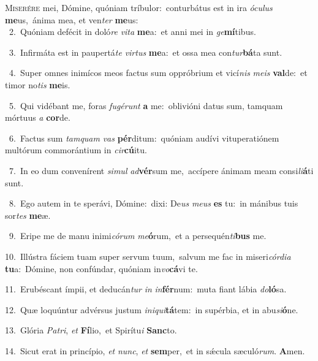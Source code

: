 \lettrine{\initial\textcolor{\initialcolor}{M}}{iserére} mei, Dómine, quóniam tríbulor:~\dagger conturbátus est in ira \textit{ó}\-\textit{cu}\textit{lus} \textbf{me}\-us,~\star ánima mea, et ven\textit{ter} \textbf{me}\-us:\\
{\numbfont\textcolor{\numbcolor}{~2.}}~Quóniam defécit in doló\textit{re} \textit{vi}\-\textit{ta} \textbf{me}\-a:~\star et anni mei in \textit{ge}\-\textbf{mí}tibus.\par
{\numbfont\textcolor{\numbcolor}{~3.}}~Infirmáta est in paupertá\textit{te} \textit{vir}\-\textit{tus} \textbf{me}\-a:~\star et ossa mea con\-\textit{tur}\-\textbf{bá}ta sunt.\par
{\numbfont\textcolor{\numbcolor}{~4.}}~Super omnes inimícos meos factus sum oppróbrium et vicí\textit{nis} \textit{me}\-\textit{is} \textbf{val}\-de:~\star et timor no\textit{tis} \textbf{me}\-is.\par
{\numbfont\textcolor{\numbcolor}{~5.}}~Qui vidébant me, foras \textit{fu}\-\textit{gé}\textit{runt} \textbf{a} me:~\star oblivióni datus sum, tamquam mórtuus \textit{a} \textbf{cor}\-de.\par
{\numbfont\textcolor{\numbcolor}{~6.}}~Factus sum \textit{tam}\-\textit{quam} \textit{vas} \textbf{pér}\-ditum:~\star quóniam audívi vituperatiónem multórum commorántium in \textit{cir}\-\textbf{cú}itu.\par
{\numbfont\textcolor{\numbcolor}{~7.}}~In eo dum convenírent \textit{si}\-\textit{mul} \textit{ad}\-\textbf{vér}sum me,~\star accípere ánimam meam consi\-\textit{li}\-\textbf{á}ti sunt.\par
{\numbfont\textcolor{\numbcolor}{~8.}}~Ego autem in te sperávi, Dómine:~\dagger dixi: De\textit{us} \textit{me}\-\textit{us} \textbf{es} tu:~\star in mánibus tuis sor\textit{tes} \textbf{me}\-æ.\par
{\numbfont\textcolor{\numbcolor}{~9.}}~Eripe me de manu inimi\-\textit{có}\-\textit{rum} \textit{me}\-\textbf{ó}rum,~\star et a persequén\-\textit{ti}\-\textbf{bus} me.\par
{\numbfont\textcolor{\numbcolor}{10.}}~Illústra fáciem tuam super servum tuum,~\dagger salvum me fac in miseri\-\textit{cór}\-\textit{di}\textit{a} \textbf{tu}\-a:~\star Dómine, non confúndar, quóniam in\-\textit{vo}\-\textbf{cá}vi te.\par
{\numbfont\textcolor{\numbcolor}{11.}}~Erubéscant ímpii, et deducán\textit{tur} \textit{in} \textit{in}\-\textbf{fér}num:~\star muta fiant lábia \textit{do}\-\textbf{ló}sa.\par
{\numbfont\textcolor{\numbcolor}{12.}}~Quæ loquúntur advérsus justum \textit{in}\-\textit{i}\textit{qui}\textbf{tá}tem:~\star in supérbia, et in abu\-\textit{si}\-\textbf{ó}ne.\par
{\numbfont\textcolor{\numbcolor}{13.}}~Glória \textit{Pa}\-\textit{tri}, \textit{et} \textbf{Fí}\-lio,~\star et Spirítu\textit{i} \textbf{Sanc}\-to.\par
{\numbfont\textcolor{\numbcolor}{14.}}~Sicut erat in princípio, \textit{et} \textit{nunc}\-, \textit{et} \textbf{sem}\-per,~\star et in sǽcula sæculó\-\textit{rum}\-. \textbf{A}\-men.\par
